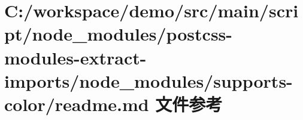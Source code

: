\hypertarget{node__modules_2postcss-modules-extract-imports_2node__modules_2supports-color_2_r_e_a_d_m_e_8md}{}\section{C\+:/workspace/demo/src/main/script/node\+\_\+modules/postcss-\/modules-\/extract-\/imports/node\+\_\+modules/supports-\/color/readme.md 文件参考}
\label{node__modules_2postcss-modules-extract-imports_2node__modules_2supports-color_2_r_e_a_d_m_e_8md}
